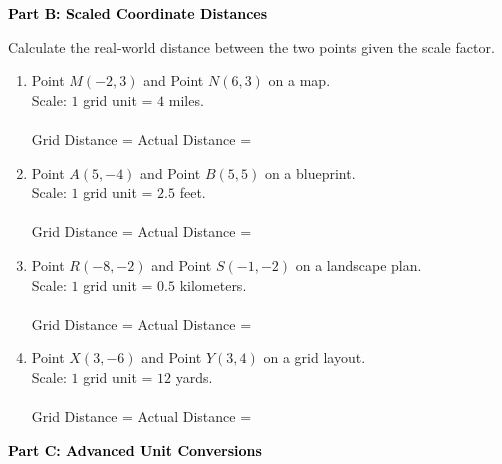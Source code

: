 \documentclass[12pt, letterpaper, fleqn]{article}
\newcommand{\blank}{\underline{\hspace{2.2cm}}}
\newcommand{\blanklong}{\underline{\hspace{6.5cm}}}
\begin{document}
\newpage

\begin{tcolorbox}[colback=black!10]
    \large\textcolor{black}{\textbf{Part B: Scaled Coordinate Distances}}
\end{tcolorbox}

\vspace{3mm}

\noindent
Calculate the real-world distance between the two points given the scale factor.

\vspace{5mm}

\begin{enumerate}[itemsep=2.2cm, leftmargin=0.6cm]
\item Point $M(-2, 3)$ and Point $N(6, 3)$ on a map. \\
Scale: $1$ grid unit = $4$ miles. \\ \\
Grid Distance = \blank \quad Actual Distance = \blanklong

\item Point $A(5, -4)$ and Point $B(5, 5)$ on a blueprint. \\
Scale: $1$ grid unit = $2.5$ feet. \\ \\
Grid Distance = \blank \quad Actual Distance = \blanklong

\item Point $R(-8, -2)$ and Point $S(-1, -2)$ on a landscape plan. \\
Scale: $1$ grid unit = $0.5$ kilometers. \\ \\
Grid Distance = \blank \quad Actual Distance = \blanklong

\item Point $X(3, -6)$ and Point $Y(3, 4)$ on a grid layout. \\
Scale: $1$ grid unit = $12$ yards. \\ \\
Grid Distance = \blank \quad Actual Distance = \blanklong
\end{enumerate}

\newpage

\begin{tcolorbox}[colback=black!10]
    \large\textcolor{black}{\textbf{Part C: Advanced Unit Conversions}}
\end{tcolorbox}
\end{document}
